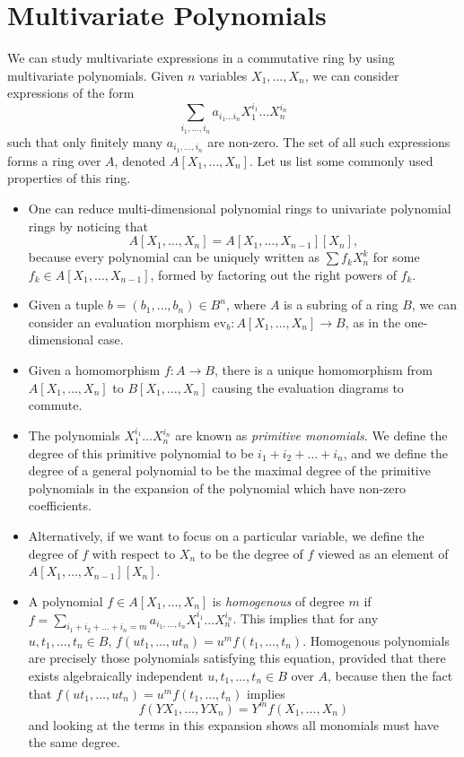 \section{Multivariate Polynomials}

We can study multivariate expressions in a commutative ring by using multivariate polynomials. Given $n$ variables $X_1, \dots, X_n$, we can consider expressions of the form
%
\[ \sum_{i_1, \dots, i_n} a_{i_1 \dots i_n} X_1^{i_1} \dots X_n^{i_n} \]
%
such that only finitely many $a_{i_1, \dots, i_n}$ are non-zero. The set of all such expressions forms a ring over $A$, denoted $A[X_1, \dots, X_n]$. Let us list some commonly used properties of this ring.
%
\begin{itemize}
	\item One can reduce multi-dimensional polynomial rings to univariate polynomial rings by noticing that
	\[ A[X_1, \dots, X_n] = A[X_1, \dots, X_{n-1}][X_n], \]
	because every polynomial can be uniquely written as $\sum f_k X_n^k$ for some $f_k \in A[X_1, \dots, X_{n-1}]$, formed by factoring out the right powers of $f_k$.

	\item Given a tuple $b = (b_1, \dots, b_n) \in B^n$, where $A$ is a subring of a ring $B$, we can consider an evaluation morphism $\text{ev}_b: A[X_1, \dots, X_n] \to B$, as in the one-dimensional case.

	\item Given a homomorphism $f: A \to B$, there is a unique homomorphism from $A[X_1, \dots, X_n]$ to $B[X_1, \dots, X_n]$ causing the evaluation diagrams to commute.

	\item The polynomials $X_1^{i_1} \dots X_n^{i_n}$ are known as {\it primitive monomials}. We define the degree of this primitive polynomial to be $i_1 + i_2 + \dots + i_n$, and we define the degree of a general polynomial to be the maximal degree of the primitive polynomials in the expansion of the polynomial which have non-zero coefficients. 

	\item Alternatively, if we want to focus on a particular variable, we define the degree of $f$ with respect to $X_n$ to be the degree of $f$ viewed as an element of $A[X_1, \dots, X_{n-1}][X_n]$.

	\item A polynomial $f \in A[X_1, \dots, X_n]$ is {\it homogenous} of degree $m$ if $f = \sum_{i_1 + i_2 + \dots + i_n = m} a_{i_1, \dots, i_n} X_1^{i_1} \dots X_n^{i_n}$. This implies that for any $u,t_1, \dots, t_n \in B$, $f(ut_1, \dots, ut_n) = u^m f(t_1, \dots, t_n)$. Homogenous polynomials are precisely those polynomials satisfying this equation, provided that there exists algebraically independent $u, t_1, \dots, t_n \in B$ over $A$, because then the fact that $f(ut_1, \dots, ut_n) = u^m f(t_1, \dots, t_n)$ implies
	\[ f(YX_1, \dots, YX_n) = Y^m f(X_1, \dots, X_n) \]
	and looking at the terms in this expansion shows all monomials must have the same degree.
\end{itemize}


